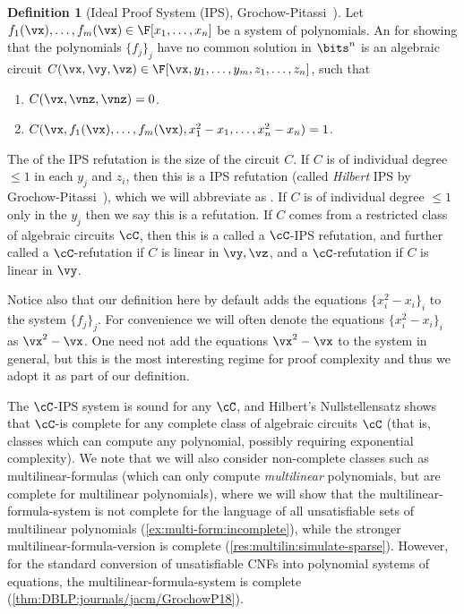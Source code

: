 \documentclass[11pt]{article}
\numberwithin{equation}{section}
\theoremstyle{definition}
\newtheorem{definition}[theorem]{Definition}
\theoremstyle{plain}
\begin{document}
\begin{definition}[Ideal Proof System (IPS), Grochow-Pitassi~\cite{DBLP:journals/jacm/GrochowP18}]\label{def:orig-IPS}
        Let $f_1(\vx),\ldots,f_m(\vx)\in\F[x_1,\ldots,x_n]$ be a system of polynomials. An  for showing that the polynomials $\{f_j\}_j$ have no common solution in $\bits^n$ is an algebraic circuit $C(\vx,\vy,\vz)\in\F[\vx,y_1,\ldots,y_m,z_1,\ldots,z_n]$, such that
        \begin{enumerate}
                \item $C(\vx,\vnz,\vnz) = 0$.
                \item $C(\vx,f_1(\vx),\ldots,f_m(\vx),x_1^2-x_1,\ldots,x_n^2-x_n)=1$.
        \end{enumerate}
        The  of the IPS refutation is the size of the circuit $C$. If $C$ is of individual degree $\le 1$ in each $y_j$ and $z_i$, then this is a  IPS refutation (called \emph{Hilbert} IPS by Grochow-Pitassi~\cite{DBLP:journals/jacm/GrochowP18}), which we will abbreviate as \lIPS. If $C$ is of individual degree $\le 1$ only in the $y_j$ then we say this is a \lbIPS refutation. If $C$ comes from a restricted class of algebraic circuits $\cC$, then this is a called a $\cC$-IPS refutation, and further called a $\cC$-\lIPS refutation if $C$ is linear in $\vy,\vz$, and a $\cC$-\lbIPS refutation if $C$ is linear in $\vy$.
\end{definition}

Notice also that our definition here by default adds the equations $\{x_i^2-x_i\}_i$ to the system $\{f_j\}_j$.  For convenience we will often denote the equations $\{x_i^2-x_i\}_i$ as $\vx^2-\vx$. One need not add the equations $\vx^2-\vx$ to the system in general, but this is the most interesting regime for proof complexity and thus we adopt it as part of our definition.

The $\cC$-IPS system is sound for any $\cC$, and Hilbert's Nullstellensatz shows that $\cC$-\lIPS is complete for any complete class of algebraic circuits $\cC$ (that is, classes which can compute any polynomial, possibly requiring exponential complexity). We note that we will also consider non-complete classes such as multilinear-formulas (which can only compute \emph{multilinear} polynomials, but are complete for multilinear polynomials), where we will show that the multilinear-formula-\lIPS system is not complete for the language of all unsatisfiable sets of multilinear polynomials (\autoref{ex:multi-form:incomplete}), while the stronger multilinear-formula-\lbIPS version is complete (\autoref{res:multilin:simulate-sparse}).  However, for the standard conversion of unsatisfiable CNFs into polynomial systems of equations, the multilinear-formula-\lIPS system is complete (\autoref{thm:DBLP:journals/jacm/GrochowP18}).
\end{document}
